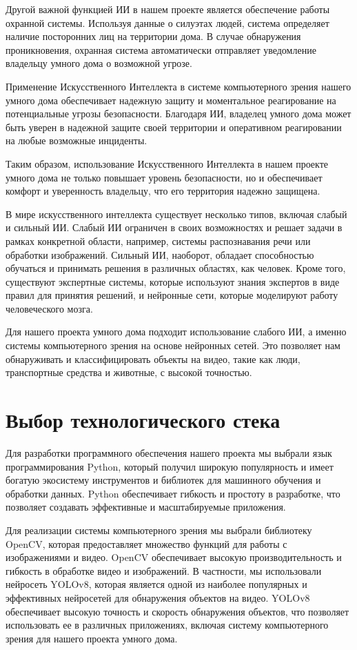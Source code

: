 Другой важной функцией ИИ в нашем проекте является обеспечение работы охранной системы. Используя данные о силуэтах людей, система определяет наличие посторонних лиц на территории дома. В случае обнаружения проникновения, охранная система автоматически отправляет уведомление владельцу умного дома о возможной угрозе.

Применение Искусственного Интеллекта в системе компьютерного зрения нашего умного дома обеспечивает надежную защиту и моментальное реагирование на потенциальные угрозы безопасности. Благодаря ИИ, владелец умного дома может быть уверен в надежной защите своей территории и оперативном реагировании на любые возможные инциденты.

Таким образом, использование Искусственного Интеллекта в нашем проекте умного дома не только повышает уровень безопасности, но и обеспечивает комфорт и уверенность владельцу, что его территория надежно защищена.

В мире искусственного интеллекта существует несколько типов, включая слабый и сильный ИИ. Слабый ИИ ограничен в своих возможностях и решает задачи в рамках конкретной области, например, системы распознавания речи или обработки изображений. Сильный ИИ, наоборот, обладает способностью обучаться и принимать решения в различных областях, как человек. Кроме того, существуют экспертные системы, которые используют знания экспертов в виде правил для принятия решений, и нейронные сети, которые моделируют работу человеческого мозга.

Для нашего проекта умного дома подходит использование слабого ИИ, а именно системы компьютерного зрения на основе нейронных сетей. Это позволяет нам обнаруживать и классифицировать объекты на видео, такие как люди, транспортные средства и животные, с высокой точностью.

\section{Выбор технологического стека}
Для разработки программного обеспечения нашего проекта мы выбрали язык программирования Python, который получил широкую популярность и имеет богатую экосистему инструментов и библиотек для машинного обучения и обработки данных. Python обеспечивает гибкость и простоту в разработке, что позволяет создавать эффективные и масштабируемые приложения.

Для реализации системы компьютерного зрения мы выбрали библиотеку OpenCV, которая предоставляет множество функций для работы с изображениями и видео. OpenCV обеспечивает высокую производительность и гибкость в обработке видео и изображений. В частности, мы использовали нейросеть YOLOv8, которая является одной из наиболее популярных и эффективных нейросетей для обнаружения объектов на видео. YOLOv8 обеспечивает высокую точность и скорость обнаружения объектов, что позволяет использовать ее в различных приложениях, включая систему компьютерного зрения для нашего проекта умного дома.

